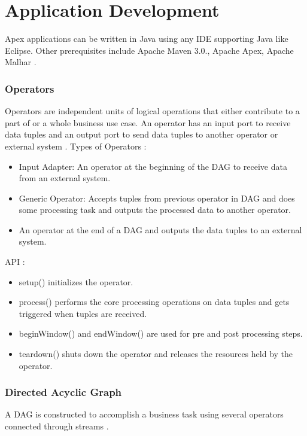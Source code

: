 \documentclass[9pt,twocolumn,twoside]{../../styles/osajnl}
\begin{document}
\section{Application Development}
Apex applications can be written in Java using any IDE supporting Java like Eclipse.
Other prerequisites include Apache Maven 3.0., Apache Apex, Apache Malhar \cite{www-apacheapexappdevdoc}.

\subsubsection{Operators}
Operators are independent units of logical operations that either contribute to a part of or a whole business use case. An operator has an input port to receive data tuples and an output port to send data tuples to another operator  or external system \cite{www-apacheapexoperatordoc}.
Types of Operators \cite{www-apacheapexoperatordoc}:
\begin{itemize}
  \item Input Adapter:  An operator at the beginning of the DAG to receive data from an external system.
  \item  Generic Operator: Accepts tuples from previous operator in DAG and does some processing task and outputs the processed data to another operator.
  \item An operator at the end of a DAG and outputs the data tuples to an external system. 
  
\end{itemize}

API \cite{www-apacheapexoperatordoc}:
\begin{itemize}
  \item setup() initializes the operator.
  \item process()  performs the core processing operations on data tuples and gets triggered when tuples are received.
  \item beginWindow()  and endWindow() are used for pre and post processing steps.
  \item teardown() shuts down the operator and releases the resources held by the operator.
\end{itemize}
\subsubsection{Directed Acyclic Graph}
A DAG is constructed to accomplish a business task using several operators connected through streams \cite{www-apacheapexappdevdoc}.
\end{document}
